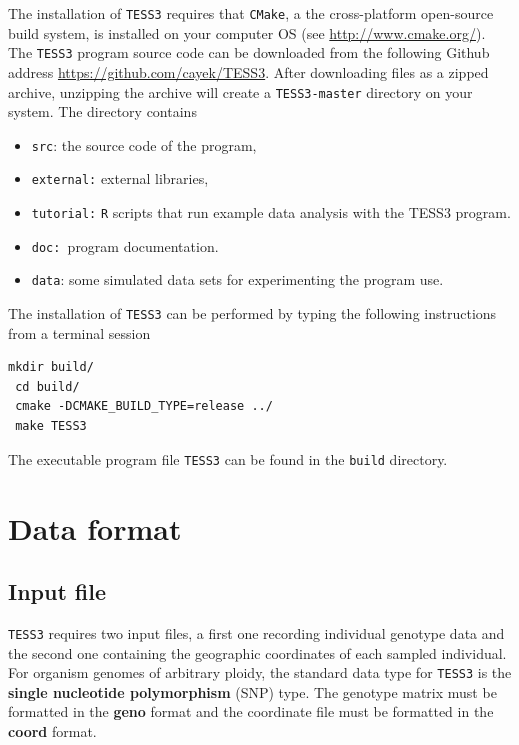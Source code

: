 \documentclass[10pt,a4paper]{article}
\begin{document}
The installation of {\tt TESS3} requires that {\tt CMake}, a the cross-platform open-source build system, is installed on your computer OS (see \url{ http://www.cmake.org/}).  The {\tt TESS3}  program source code can be downloaded from the following Github address \url{https://github.com/cayek/TESS3}. After downloading files as a zipped archive, unzipping the archive will create a {\tt TESS3-master} directory on your system. The  directory contains 
\begin{itemize}
\item   {\tt src}: the source code of the program,

\item   {\tt external:} external libraries,

\item   {\tt tutorial:} {\tt R} scripts that run example data analysis with the TESS3 program.

\item     {\tt doc: }program documentation.

\item     {\tt data}: some simulated data sets for experimenting the program use.
\end{itemize}
\noindent The installation of {\tt TESS3} can be performed by typing the following instructions from a terminal session 

\begin{Verbatim}[frame = single]
 mkdir build/
 cd build/
 cmake -DCMAKE_BUILD_TYPE=release ../
 make TESS3
\end{Verbatim}

 \noindent The executable program file {\tt TESS3} can be found in the {\tt build} directory.  
  
\section{Data format}

\subsection{Input file}

{\tt TESS3} requires two input files, a first one recording individual genotype data and the second one containing the geographic coordinates of  each sampled individual. For organism genomes of arbitrary ploidy, the standard data type for {\tt TESS3} is the {\bf single nucleotide polymorphism} (SNP) type.  The genotype matrix must be formatted in the {\bf geno} format and the coordinate file must be formatted in the {\bf coord} format.
\end{document}

